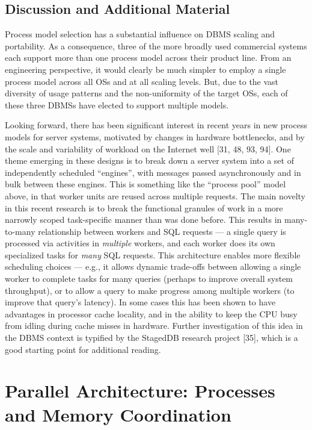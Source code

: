 \documentclass[a4paper,11pt,twoside,openright]{book}
\begin{document}
\hypertarget{discussion-and-additional-material}{%
\section{Discussion and Additional
Material}\label{discussion-and-additional-material}}

Process model selection has a substantial influence on DBMS scaling and
portability. As a consequence, three of the more broadly used commercial
systems each support more than one process model across their product
line. From an engineering perspective, it would clearly be much simpler
to employ a single process model across all OSs and at all scaling
levels. But, due to the vast diversity of usage patterns and the
non-uniformity of the target OSs, each of these three DBMSs have elected
to support multiple models.

Looking forward, there has been significant interest in recent years in
new process models for server systems, motivated by changes in hardware
bottlenecks, and by the scale and variability of workload on the
Internet well {[}31, 48, 93, 94{]}. One theme emerging in these designs
is to break down a server system into a set of independently scheduled
``engines'', with messages passed asynchronously and in bulk between
these engines. This is something like the ``process pool'' model above,
in that worker units are reused across multiple requests. The main
novelty in this recent research is to break the functional granules of
work in a more narrowly scoped task-specific manner than was done
before. This results in many-to-many relationship between workers and
SQL requests --- a single query is processed via activities in
\emph{multiple} workers, and each worker does its own specialized tasks
for \emph{many} SQL requests. This architecture enables more flexible
scheduling choices --- e.g., it allows dynamic trade-offs between
allowing a single worker to complete tasks for many queries (perhaps to
improve overall system throughput), or to allow a query to make progress
among multiple workers (to improve that query's latency). In some cases
this has been shown to have advantages in processor cache locality, and
in the ability to keep the CPU busy from idling during cache misses in
hardware. Further investigation of this idea in the DBMS context is
typified by the StagedDB research project {[}35{]}, which is a good
starting point for additional reading.

\hypertarget{parallel-architecture-processes-and-memory-coordination}{%
\chapter{Parallel Architecture: Processes and Memory
Coordination}\label{parallel-architecture-processes-and-memory-coordination}}
\end{document}
